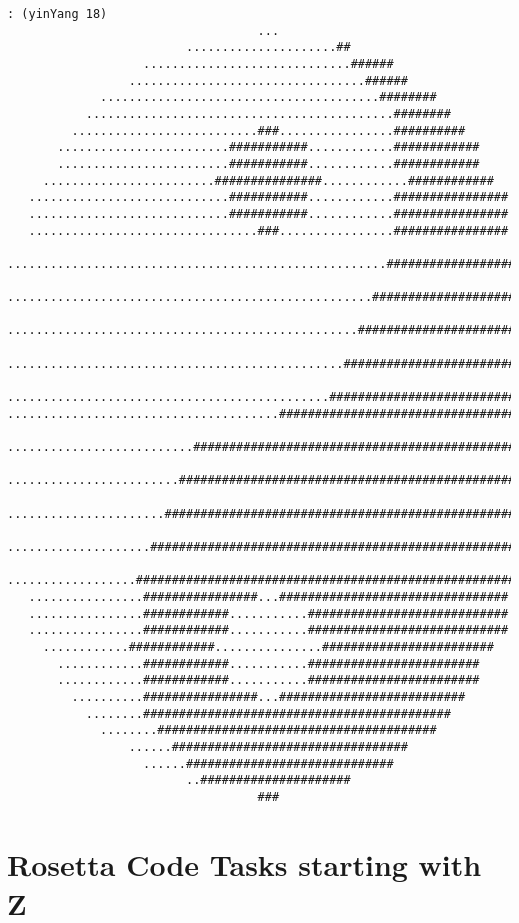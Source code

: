 \begin{verbatim}
: (yinYang 18)
                                   ...
                         .....................##
                   .............................######
                 .................................######
             .......................................########
           ...........................................########
         ..........................###................##########
       ........................###########............############
       ........................###########............############
     ........................###############............############
   ............................###########............################
   ............................###########............################
   ................................###................################
 .....................................................##################
 ...................................................####################
 .................................................######################
 ...............................................########################
 .............................................##########################
......................................###################################
 ..........................#############################################
 ........................###############################################
 ......................#################################################
 ....................###################################################
 ..................#####################################################
   ................################...################################
   ................############...........############################
   ................############...........############################
     ............############...............########################
       ............############...........########################
       ............############...........########################
         ..........################...##########################
           ........###########################################
             ........#######################################
                 ......#################################
                   ......#############################
                         ..#####################
                                   ###

\end{verbatim}

\chapter{Rosetta Code Tasks starting with Z}

